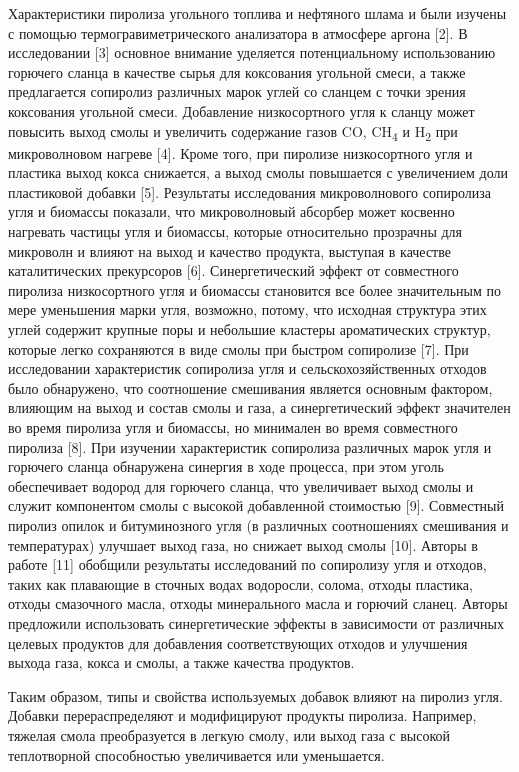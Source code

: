 Характеристики пиролиза угольного топлива и нефтяного шлама и были
изучены с помощью термогравиметрического анализатора в атмосфере аргона
{[}2{]}. В исследовании {[}3{]} основное внимание уделяется
потенциальному использованию горючего сланца в качестве сырья для
коксования угольной смеси, а также предлагается сопиролиз различных
марок углей со сланцем с точки зрения коксования угольной смеси.
Добавление низкосортного угля к сланцу может повысить выход смолы и
увеличить содержание газов CO, CH\textsubscript{4} и H\textsubscript{2}
при микроволновом нагреве {[}4{]}. Кроме того, при пиролизе
низкосортного угля и пластика выход кокса снижается, а выход смолы
повышается с увеличением доли пластиковой добавки {[}5{]}. Результаты
исследования микроволнового сопиролиза угля и биомассы показали, что
микроволновый абсорбер может косвенно нагревать частицы угля и биомассы,
которые относительно прозрачны для микроволн и влияют на выход и
качество продукта, выступая в качестве каталитических прекурсоров
{[}6{]}. Синергетический эффект от совместного пиролиза низкосортного
угля и биомассы становится все более значительным по мере уменьшения
марки угля, возможно, потому, что исходная структура этих углей содержит
крупные поры и небольшие кластеры ароматических структур, которые легко
сохраняются в виде смолы при быстром сопиролизе {[}7{]}. При
исследовании характеристик сопиролиза угля и сельскохозяйственных
отходов было обнаружено, что соотношение смешивания является основным
фактором, влияющим на выход и состав смолы и газа, а синергетический
эффект значителен во время пиролиза угля и биомассы, но минимален во
время совместного пиролиза {[}8{]}. При изучении характеристик
сопиролиза различных марок угля и горючего сланца обнаружена синергия в
ходе процесса, при этом уголь обеспечивает водород для горючего сланца,
что увеличивает выход смолы и служит компонентом смолы с высокой
добавленной стоимостью {[}9{]}. Совместный пиролиз опилок и
битуминозного угля (в различных соотношениях смешивания и температурах)
улучшает выход газа, но снижает выход смолы {[}10{]}. Авторы в работе
{[}11{]} обобщили результаты исследований по сопиролизу угля и отходов,
таких как плавающие в сточных водах водоросли, солома, отходы пластика,
отходы смазочного масла, отходы минерального масла и горючий сланец.
Авторы предложили использовать синергетические эффекты в зависимости от
различных целевых продуктов для добавления соответствующих отходов и
улучшения выхода газа, кокса и смолы, а также качества продуктов.

Таким образом, типы и свойства используемых добавок влияют на пиролиз
угля. Добавки перераспределяют и модифицируют продукты пиролиза.
Например, тяжелая смола преобразуется в легкую смолу, или выход газа с
высокой теплотворной способностью увеличивается или уменьшается.

